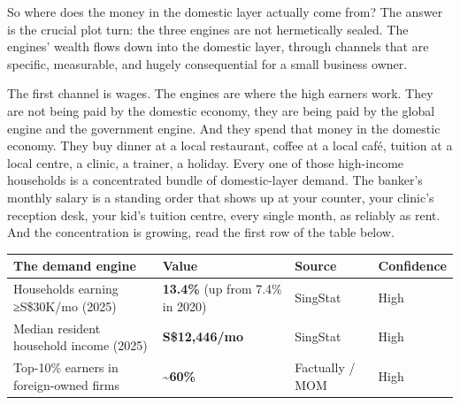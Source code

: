 \documentclass[10pt,twoside,openany]{memoir}
\renewcommand{\arraystretch}{1.1}
\begin{document}
{{{{So where does the money in the domestic layer actually come from? The
answer is the crucial plot turn: the three engines are not hermetically
sealed. The engines' wealth flows down into the domestic layer, through
channels that are specific, measurable, and hugely consequential for a
small business owner.

The first channel is wages. The engines are where the high earners work.
They are not being paid by the domestic economy, they are being paid by
the global engine and the government engine. And they spend that money
in the domestic economy. They buy dinner at a local restaurant, coffee
at a local café, tuition at a local centre, a clinic, a trainer, a
holiday. Every one of those high-income households is a concentrated
bundle of domestic-layer demand. The banker's monthly salary is a
standing order that shows up at your counter, your clinic's reception
desk, your kid's tuition centre, every single month, as reliably as
rent. And the concentration is growing, read the first row of the table
below.

{\def\LTcaptype{none} %
{\renewcommand{\arraystretch}{0.9}\begin{longtable}[]{@{}
  >{\raggedright\arraybackslash}p{}
  >{\raggedright\arraybackslash}p{}
  >{\raggedright\arraybackslash}p{}
  >{\raggedright\arraybackslash}p{}@{}}
\toprule\noalign{}
\begin{minipage}[b]{\linewidth}\raggedright
The demand engine
\end{minipage} & \begin{minipage}[b]{\linewidth}\raggedright
Value
\end{minipage} & \begin{minipage}[b]{\linewidth}\raggedright
Source
\end{minipage} & \begin{minipage}[b]{\linewidth}\raggedright
Confidence
\end{minipage} \\
\midrule\noalign{}
\endhead
\bottomrule\noalign{}
\endlastfoot
Households earning ≥S\$30K/mo (2025) & \textbf{13.4\%} (up from 7.4\% in
2020) & SingStat & High \\
Median resident household income (2025) & \textbf{S\$12,446/mo} &
SingStat & High \\
Top-10\% earners in foreign-owned firms & \textbf{\textasciitilde60\%} &
Factually / MOM & High \\
\end{longtable}
}

}}}}}
\end{document}
